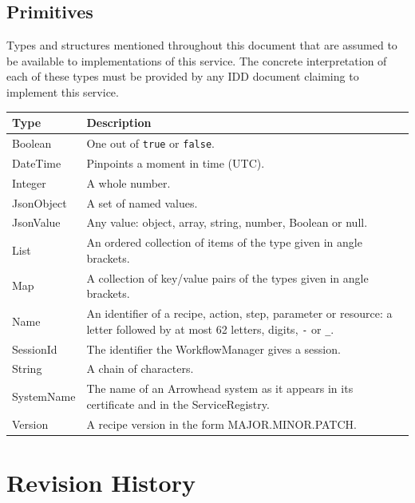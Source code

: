 \documentclass[a4paper]{arrowhead}
\newcommand{\pdef}[1]{{\textcolor{ArrowheadGrey}{#1\label{sec:model:primitives:#1}\label{sec:model:primitives:#1s}\label{sec:model:primitives:#1es}}}}
\begin{document}
\subsection{Primitives}
\label{sec:model:primitives}
Types and structures mentioned throughout this document that are assumed to be available to implementations of this
service. The concrete interpretation of each of these types must be provided by any IDD document claiming to implement
this service.

{\small
\begin{longtable}{|p{3.2cm}|p{12.6cm}|}

\hline
\rowcolor{gray!33} Type & Description \\ \hline
\endhead
\pdef{Boolean} & One out of \texttt{true} or \texttt{false}. \\ \hline
\pdef{DateTime} & Pinpoints a moment in time (UTC). \\ \hline
\pdef{Integer} & A whole number. \\ \hline
\pdef{JsonObject} & A set of named values. \\ \hline
\pdef{JsonValue} & Any value: object, array, string, number, Boolean or null. \\ \hline
\pdef{List} & An ordered collection of items of the type given in angle brackets. \\ \hline
\pdef{Map} & A collection of key/value pairs of the types given in angle brackets. \\ \hline
\pdef{Name} & An identifier of a recipe, action, step, parameter or resource: a letter followed by at most 62 letters, digits, \texttt{-} or \texttt{\_}. \\ \hline
\pdef{SessionId} & The identifier the WorkflowManager gives a session. \\ \hline
\pdef{String} & A chain of characters. \\ \hline
\pdef{SystemName} & The name of an Arrowhead system as it appears in its certificate and in the ServiceRegistry. \\ \hline
\pdef{Version} & A recipe version in the form MAJOR.MINOR.PATCH. \\ \hline
\end{longtable}
}


\newpage



\newpage

\section{Revision History}
\end{document}
